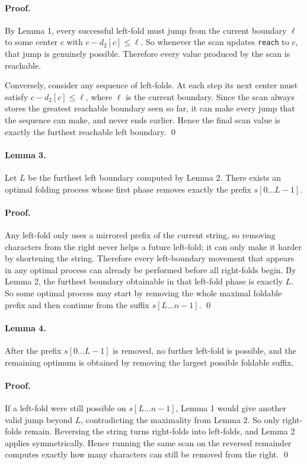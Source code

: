 \documentclass[11pt]{article}
\begin{document}
\paragraph{Proof.}
By Lemma 1, every successful left-fold must jump from the current boundary $\ell$ to some center $c$ with
$c-d_2[c] \le \ell$.
So whenever the scan updates \texttt{reach} to $c$, that jump is genuinely possible.
Therefore every value produced by the scan is reachable.

Conversely, consider any sequence of left-folds.
At each step its next center must satisfy $c-d_2[c] \le \ell$, where $\ell$ is the current boundary.
Since the scan always stores the greatest reachable boundary seen so far, it can make every jump that the
sequence can make, and never ends earlier.
Hence the final scan value is exactly the furthest reachable left boundary. \qed

\paragraph{Lemma 3.}
Let $L$ be the furthest left boundary computed by Lemma 2.
There exists an optimal folding process whose first phase removes exactly the prefix $s[0 \dots L-1]$.

\paragraph{Proof.}
Any left-fold only uses a mirrored prefix of the current string, so removing characters from the right never
helps a future left-fold; it can only make it harder by shortening the string.
Therefore every left-boundary movement that appears in any optimal process can already be performed before
all right-folds begin.
By Lemma 2, the furthest boundary obtainable in that left-fold phase is exactly $L$.
So some optimal process may start by removing the whole maximal foldable prefix and then continue from the
suffix $s[L \dots n-1]$. \qed

\paragraph{Lemma 4.}
After the prefix $s[0 \dots L-1]$ is removed, no further left-fold is possible, and the remaining optimum is
obtained by removing the largest possible foldable suffix.

\paragraph{Proof.}
If a left-fold were still possible on $s[L \dots n-1]$, Lemma 1 would give another valid jump beyond $L$,
contradicting the maximality from Lemma 2.
So only right-folds remain.
Reversing the string turns right-folds into left-folds, and Lemma 2 applies symmetrically.
Hence running the same scan on the reversed remainder computes exactly how many characters can still be
removed from the right. \qed
\end{document}
